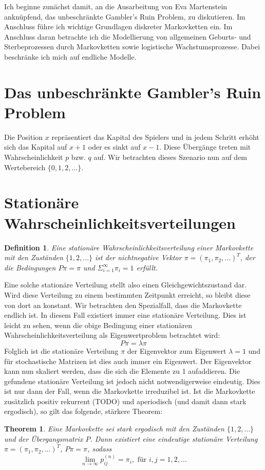 \documentclass{article}
\newtheorem{defi}{Definition}
\newtheorem{thm}{Theorem}
\begin{document}
Ich beginne zunächst damit, an die Ausarbeitung von Eva Martenstein
anknüpfend, das unbeschränkte Gambler's Ruin Problem, zu diskutieren. Im Anschluss führe ich wichtige Grundlagen diskreter Markovketten ein. Im
Anschluss daran betrachte ich die Modellierung von allgemeinen
Geburts- und Sterbeprozessen durch Markovketten sowie logistische Wachstumsprozesse. Dabei beschränke ich mich auf endliche Modelle.
\section{Das unbeschränkte Gambler's Ruin Problem}
Die Position $x$ repräsentiert das Kapital des Spielers und in jedem Schritt erhöht sich das Kapital auf $x+1$ oder es sinkt auf $x-1$. Diese Übergänge treten mit Wahrscheinlichkeit $p$ bzw{.} $q$ auf. Wir betrachten dieses Szenario nun auf dem Wertebereich $\{0,1,2,\dots\}$. 
\section{Stationäre Wahrscheinlichkeitsverteilungen}
\begin{defi}
  Eine stationäre Wahrscheinlichkeitsverteilung einer Markovkette mit den Zuständen $\{1,2,...\}$ ist der nichtnegative Vektor $π = (π_1,π_2,...)^T$, der die Bedingungen $Pπ = π$ und $Σ_{i=1}^∞π_i = 1$ erfüllt.
\end{defi}
Eine solche stationäre Verteilung stellt also einen
Gleichgewichtszustand dar. Wird diese Verteilung zu einem bestimmten
Zeitpunkt erreicht, so bleibt diese von dort an konstant.
Wir betrachten den Spezialfall, dass die Markovkette endlich ist. In
diesem Fall existiert immer eine stationäre Verteilung. Dies ist
leicht zu sehen, wenn die obige Bedingung einer stationären
Wahrscheinlichkeitsverteilung als Eigenwertproblem betrachtet wird:
\[
  Pπ = λπ
\]
Folglich ist die stationäre Verteilung $π$ der Eigenvektor zum
Eigenwert $λ=1$ und für stochastische Matrizen ist dies auch immer ein
Eigenwert. Der Eigenvektor kann nun skaliert werden, dass die sich die
Elemente zu 1 aufaddieren. Die gefundene stationäre Verteilung ist
jedoch nicht notwendigerweise eindeutig. Dies ist nur dann der Fall,
wenn die Markovkette irreduzibel ist. Ist die Markovkette zusätzlich
positiv rekurrent (TODO) und aperiodisch (und damit dann stark
ergodisch), so gilt das folgende, stärkere Theorem:
\begin{thm}
  Eine Markovkette sei stark ergodisch mit den Zuständen
  $\{1,2,\dots\}$ und der Übergangsmatrix $P$. Dann existiert eine
  eindeutige stationäre Verteilung $π = (π_1,π_2,\dots)^T$, $Pπ = π$,
  sodass
  \[
    \lim_{n →∞}p_{ij}^{(n)} = π_i, \text{ für } i,j=1,2,\dots
  \]
\end{thm}
\end{document}
